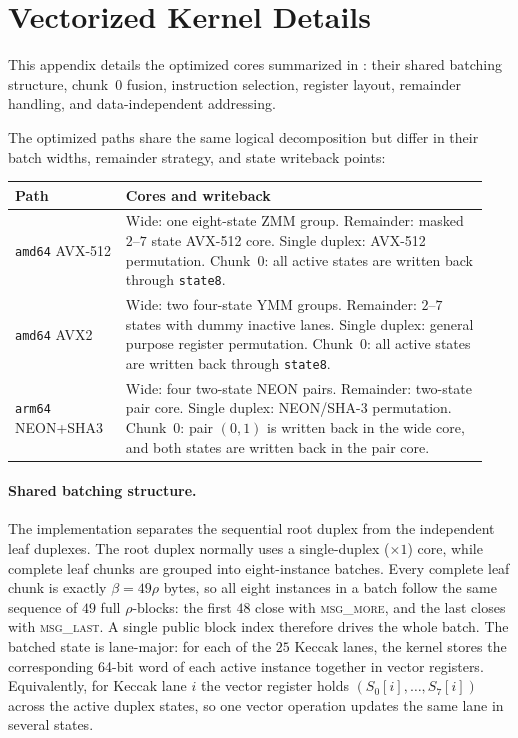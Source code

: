 \section{Vectorized Kernel Details}
\label{app:kernels}

This appendix details the optimized cores summarized in :
their shared batching structure, chunk~$0$ fusion, instruction selection,
register layout, remainder handling, and data-independent addressing.

The optimized paths share the same logical decomposition but differ in their
batch widths, remainder strategy, and state writeback points:
\begin{center}
\small
\begin{tabular}{@{}p{0.22\linewidth} p{0.72\linewidth}@{}}
\toprule
Path & Cores and writeback \\
\midrule
\texttt{amd64} AVX-512 &
Wide: one eight-state ZMM group. Remainder: masked $2$--$7$ state AVX-512 core.
Single duplex: AVX-512 permutation. Chunk~$0$: all active states are written
back through \texttt{state8}. \\
\texttt{amd64} AVX2 &
Wide: two four-state YMM groups. Remainder: $2$--$7$ states with dummy inactive
lanes. Single duplex: general purpose register permutation. Chunk~$0$: all
active states are written back through \texttt{state8}. \\
\texttt{arm64} NEON+SHA3 &
Wide: four two-state NEON pairs. Remainder: two-state pair core. Single duplex:
NEON/SHA-3 permutation. Chunk~$0$: pair $(0,1)$ is written back in the wide
core, and both states are written back in the pair core. \\
\bottomrule
\end{tabular}
\end{center}

\paragraph{Shared batching structure.}
The implementation separates the sequential root duplex from the independent
leaf duplexes. The root duplex normally uses a single-duplex ($\times 1$)
core, while complete leaf chunks are grouped into eight-instance batches.
Every complete leaf chunk is exactly $\beta = 49\rho$ bytes, so all eight
instances in a batch follow the same sequence of $49$ full $\rho$-blocks:
the first $48$ close with \textsc{msg\_more}, and the last closes with
\textsc{msg\_last}. A single public block index therefore drives the whole
batch. The batched state is lane-major: for each of the $25$ Keccak lanes,
the kernel stores the corresponding 64-bit word of each active instance
together in vector registers. Equivalently, for Keccak lane $i$ the vector
register holds $(S_0[i],\ldots,S_7[i])$ across the active duplex states, so
one vector operation updates the same lane in several states.

